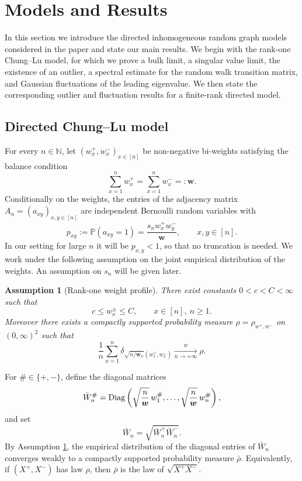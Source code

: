 \documentclass[11pt,oneside]{amsart}
\theoremstyle{plain}
\newtheorem{assumption}[theorem]{Assumption}
\numberwithin{equation}{section}
\newcommand{\N}{\mathbb{N}}
\newcommand{\wconv}{\xrightarrow[\textit{n} \to +\infty]{\quad {w} \quad}}
\newcommand{\w}{\boldsymbol{w}}
\newcommand{\scaling}{s_n}
\begin{document}
\section{Models and Results}\label{sec:results}
In this section we introduce the directed inhomogeneous random graph models considered in the paper and state our main results. We begin with the rank-one Chung--Lu model, for which we prove a bulk limit, a singular value limit, the existence of an outlier, a spectral estimate for the random walk transition matrix, and Gaussian fluctuations of the leading eigenvalue. We then state the corresponding outlier and fluctuation results for a finite-rank directed model.

\subsection{Directed Chung--Lu model}

For every $n\in \N$, let
$(w_x^+,w_x^-)_{x\in[n]}$ be non-negative bi-weights satisfying the balance condition
\[
        \sum_{x=1}^n w_x^+=\sum_{x=1}^n w_x^-=:\w.
\]
Conditionally on the weights, the entries of the adjacency matrix $A_n=(a_{xy})_{x,y\in[n]}$ are independent Bernoulli random variables with
\begin{equation}
\label{eq:sp-chung-lu}
        p_{xy}:=\mathbb P(a_{xy}=1)=\frac{s_n w_x^+w_y^-}{\w},
        \qquad x,y\in[n].
\end{equation} 
In our setting for large $n$ it will be $p_{x,y}<1$, so that no truncation is needed.
We work under the following assumption on the joint empirical distribution of the weights. An assumption on $\scaling$ will be given later.

\begin{assumption}[Rank-one weight profile]
\label{ass:rank-one}
There exist constants $0<c<C<\infty$ such that
\begin{equation}
\label{eq:weight-bounds}
        c\le w_x^\pm\le C,\qquad x\in[n],\ n\ge1.
\end{equation}
Moreover there exists a compactly supported probability measure
$\rho=\rho_{w^+,w^-}$ on $(0,\infty)^2$ such that
\begin{equation}
\label{eq:rho-one}
        \frac1n\sum_{x=1}^n
        \delta_{\sqrt{n/\w_n}(w_x^+,w_x^-)}
        \wconv \rho .
\end{equation}
\end{assumption}
For $\#\in\{+,-\}$, define the diagonal matrices
\begin{equation}
\bar{W}_n^{\#} =
{\rm Diag}
\left(\sqrt{\frac{n}{\w}}\,w_1^{\#},\dots,
\sqrt{\frac{n}{\w}}\,w_n^{\#}\right),
\end{equation}
and set
\begin{equation}
\bar W_n=\sqrt{\bar W_n^+\bar W_n^-}.
\end{equation}
By Assumption \ref{ass:rank-one}, the empirical distribution of the diagonal entries of $\bar W_n$ converges weakly to a compactly supported probability measure $\bar\rho$. Equivalently, if $(X^+,X^-)$ has law $\rho$, then $\bar\rho$ is the law of $\sqrt{X^+X^-}$.
\end{document}
